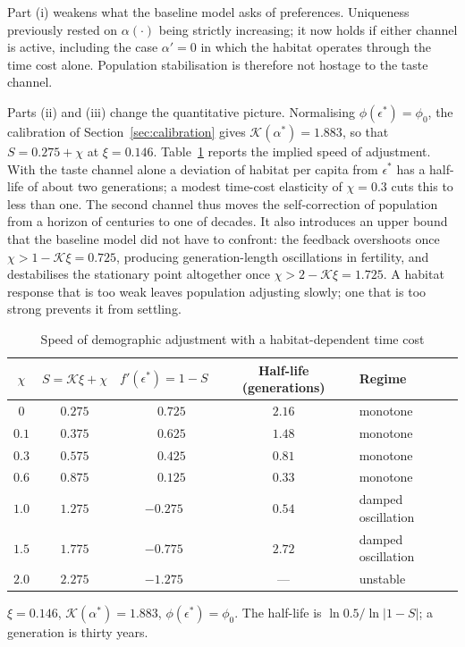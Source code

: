 \documentclass[11pt]{article}
\begin{document}
Part (i) weakens what the baseline model asks of preferences. Uniqueness previously rested on
$\alpha(\cdot)$ being strictly increasing; it now holds if either channel is active, including the
case $\alpha'=0$ in which the habitat operates through the time cost alone. Population
stabilisation is therefore not hostage to the taste channel.

Parts (ii) and (iii) change the quantitative picture. Normalising $\phi(\epsilon^{\ast})=\phi_0$,
the calibration of Section~\ref{sec:calibration} gives $\mathcal{K}(\alpha^{\ast})=1.883$, so that
$S=0.275+\chi$ at $\xi=0.146$. Table~\ref{tab:halflife} reports the implied speed of adjustment.
With the taste channel alone a deviation of habitat per capita from $\epsilon^{\ast}$ has a
half-life of about two generations; a modest time-cost elasticity of $\chi=0.3$ cuts this to less
than one. The second channel thus moves the self-correction of population from a horizon of
centuries to one of decades. It also introduces an upper bound that the baseline model did not
have to confront: the feedback overshoots once $\chi>1-\mathcal{K}\xi=0.725$, producing
generation-length oscillations in fertility, and destabilises the stationary point altogether once
$\chi>2-\mathcal{K}\xi=1.725$. A habitat response that is too weak leaves population adjusting
slowly; one that is too strong prevents it from settling.

\begin{table}[h!]\centering
\begin{threeparttable}
\caption{Speed of demographic adjustment with a habitat-dependent time cost}
\label{tab:halflife}
\begin{tabular}{ccccl}
\toprule
$\chi$ & $S=\mathcal{K}\xi+\chi$ & $f'(\epsilon^{\ast})=1-S$ & Half-life (generations) & Regime\\
\midrule
$0$     & $0.275$ & $\phantom{-}0.725$ & $2.16$ & monotone\\
$0.1$   & $0.375$ & $\phantom{-}0.625$ & $1.48$ & monotone\\
$0.3$   & $0.575$ & $\phantom{-}0.425$ & $0.81$ & monotone\\
$0.6$   & $0.875$ & $\phantom{-}0.125$ & $0.33$ & monotone\\
$1.0$   & $1.275$ & $-0.275$           & $0.54$ & damped oscillation\\
$1.5$   & $1.775$ & $-0.775$           & $2.72$ & damped oscillation\\
$2.0$   & $2.275$ & $-1.275$           & ---    & unstable\\
\bottomrule
\end{tabular}
\begin{tablenotes}\footnotesize
\item $\xi=0.146$, $\mathcal{K}(\alpha^{\ast})=1.883$, $\phi(\epsilon^{\ast})=\phi_0$. The
half-life is $\ln 0.5/\ln|1-S|$; a generation is thirty years.
\end{tablenotes}
\end{threeparttable}
\end{table}
\end{document}
